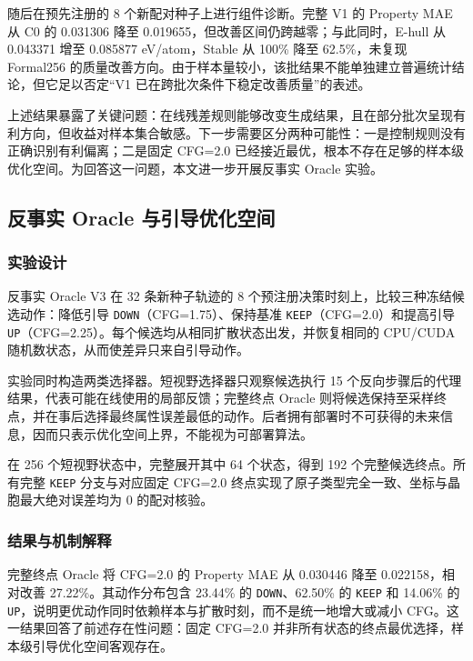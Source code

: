 随后在预先注册的 8 个新配对种子上进行组件诊断。完整 V1 的 Property MAE 从 C0 的 0.031306 降至 0.019655，但改善区间仍跨越零；与此同时，E-hull 从 0.043371 增至 0.085877 eV/atom，Stable 从 100\% 降至 62.5\%，未复现 Formal256 的质量改善方向。由于样本量较小，该批结果不能单独建立普遍统计结论，但它足以否定``V1 已在跨批次条件下稳定改善质量''的表述。

上述结果暴露了关键问题：在线残差规则能够改变生成结果，且在部分批次呈现有利方向，但收益对样本集合敏感。下一步需要区分两种可能性：一是控制规则没有正确识别有利偏离；二是固定 CFG=2.0 已经接近最优，根本不存在足够的样本级优化空间。为回答这一问题，本文进一步开展反事实 Oracle 实验。

\subsection{反事实 Oracle 与引导优化空间}

\subsubsection{实验设计}

反事实 Oracle V3 在 32 条新种子轨迹的 8 个预注册决策时刻上，比较三种冻结候选动作：降低引导 \texttt{DOWN}（CFG=1.75）、保持基准 \texttt{KEEP}（CFG=2.0）和提高引导 \texttt{UP}（CFG=2.25）。每个候选均从相同扩散状态出发，并恢复相同的 CPU/CUDA 随机数状态，从而使差异只来自引导动作。

实验同时构造两类选择器。短视野选择器只观察候选执行 15 个反向步骤后的代理结果，代表可能在线使用的局部反馈；完整终点 Oracle 则将候选保持至采样终点，并在事后选择最终属性误差最低的动作。后者拥有部署时不可获得的未来信息，因而只表示优化空间上界，不能视为可部署算法。

在 256 个短视野状态中，完整展开其中 64 个状态，得到 192 个完整候选终点。所有完整 \texttt{KEEP} 分支与对应固定 CFG=2.0 终点实现了原子类型完全一致、坐标与晶胞最大绝对误差均为 0 的配对核验。

\subsubsection{结果与机制解释}

完整终点 Oracle 将 CFG=2.0 的 Property MAE 从 0.030446 降至 0.022158，相对改善 27.22\%。其动作分布包含 23.44\% 的 \texttt{DOWN}、62.50\% 的 \texttt{KEEP} 和 14.06\% 的 \texttt{UP}，说明更优动作同时依赖样本与扩散时刻，而不是统一地增大或减小 CFG。这一结果回答了前述存在性问题：固定 CFG=2.0 并非所有状态的终点最优选择，样本级引导优化空间客观存在。

